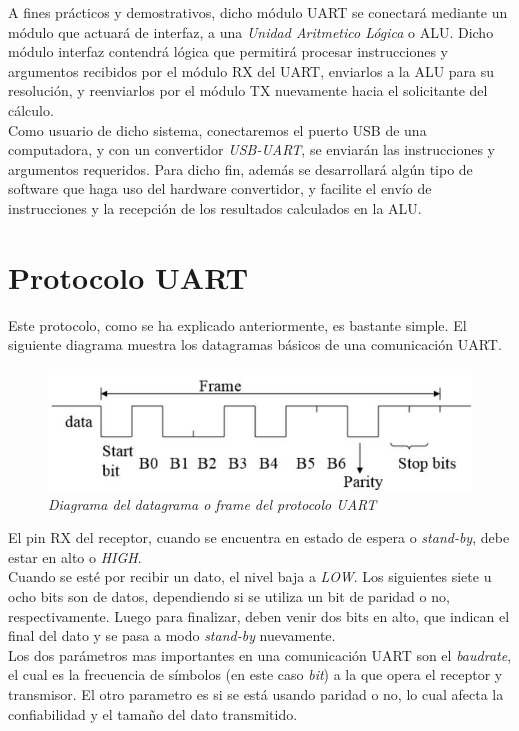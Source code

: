 \documentclass{article}
\begin{document}
\indent A fines prácticos y demostrativos, dicho módulo UART se conectará mediante un 
módulo que actuará de interfaz, a una \textit{Unidad Aritmetico Lógica} o ALU.
Dicho módulo interfaz contendrá lógica que permitirá procesar instrucciones y argumentos recibidos
por el módulo RX del UART, enviarlos a la ALU para su resolución, y reenviarlos por el módulo TX 
nuevamente hacia el solicitante del cálculo. \\
\indent Como usuario de dicho sistema, conectaremos el puerto USB de una computadora, y con un convertidor
\textit{USB-UART}, se enviarán las instrucciones y argumentos requeridos. Para dicho fin, además se 
desarrollará algún tipo de software que haga uso del hardware convertidor, y facilite el envío de instrucciones
y la recepción de los resultados calculados en la ALU.\\ 

\newpage
\section{Protocolo UART}
\indent Este protocolo, como se ha explicado anteriormente, es bastante simple. El siguiente diagrama muestra los 
datagramas básicos de una comunicación UART.

\begin{figure}[H]
    \includegraphics[scale=0.5]{protocol}
    \caption{\textit{Diagrama del datagrama o frame del protocolo UART}}
\end{figure}

\indent El pin RX del receptor, cuando se encuentra en estado de espera o \textit{stand-by}, debe estar en alto o \textit{HIGH}. \\
Cuando se esté por recibir un dato, el nivel baja a \textit{LOW}. Los siguientes siete u ocho bits son de datos, dependiendo si
se utiliza un bit de paridad o no, respectivamente. Luego para finalizar, deben venir dos bits en alto, que indican el final del dato
y se pasa a modo \textit{stand-by} nuevamente. \\
\indent Los dos parámetros mas importantes en una comunicación UART son el \textit{baudrate}, el cual es la frecuencia de símbolos (en este caso \textit{bit}) a la que opera el receptor y transmisor. El otro parametro es si se está usando paridad o no, lo cual afecta la confiabilidad y el tamaño del dato transmitido. 
\end{document}
